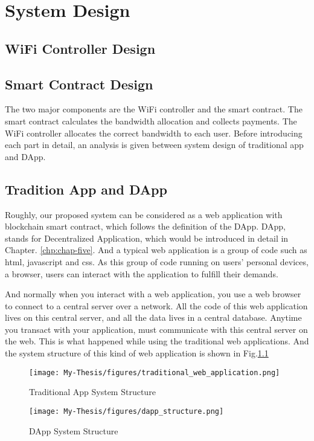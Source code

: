 \chapter{System Design}
\label{chp:chap-four}

\section{WiFi Controller Design}

\section{Smart Contract Design}

The two major components are the WiFi controller and the smart contract. The smart contract  calculates the bandwidth allocation and collects payments. The WiFi controller allocates the correct bandwidth to each user. Before introducing each part in detail, an analysis is given between system design of traditional app and DApp.

\section{Tradition App and DApp}
Roughly, our proposed system can be considered as a web application with blockchain smart contract, which follows the definition of the DApp\cite{johnston_general_nodate}. DApp, stands for Decentralized Application, which would be introduced in detail in Chapter. \ref{chp:chap-five}. And a typical web application is a group of code such as html, javascript and css. As this group of code running on users' personal devices, a browser, users can interact with the application to fulfill their demands.

And normally when you interact with a web application, you use a web browser to connect to a central server over a network. All the code of this web application lives on this central server, and all the data lives in a central database. Anytime you transact with your application, must communicate with this central server on the web. This is what happened while using the traditional web applications. And the system structure of this kind of web application is shown in  Fig.\ref{fig:app}

\begin{figure}[h]
    \centering
    \texttt{[image: My-Thesis/figures/traditional\_web\_application.png]}    
    \caption{Traditional App System Structure}
    \label{fig:app}
\end{figure}
\begin{figure}[h]
    \centering
    \texttt{[image: My-Thesis/figures/dapp\_structure.png]}    
    \caption{DApp System Structure}
    \label{fig:dapp}
\end{figure}

